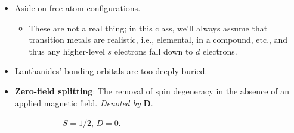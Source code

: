\documentclass[../notes.tex]{subfiles}
\begin{document}
\begin{itemize}
\begin{itemize}
    \end{itemize}
    \item Aside on free atom configurations.
    \begin{itemize}
        \item These are not a real thing; in this class, we'll always assume that transition metals are realistic, i.e., elemental, in a compound, etc., and thus any higher-level $s$ electrons fall down to $d$ electrons.
    \end{itemize}
    \item Lanthanides' bonding orbitals are too deeply buried.
    \item \textbf{Zero-field splitting}: The removal of spin degeneracy in the absence of an applied magnetic field. \emph{Denoted by} $\bm{D}$.
    \begin{figure}[h!]
        \centering
        \footnotesize
        \begin{subfigure}[b]{0.49\linewidth}
            \centering
            \caption{$S=1/2$, $D=0$.}
            \label{fig:zeroFieldSplita}
        \end{subfigure}
        \begin{subfigure}[b]{0.49\linewidth}
            \centering
\end{subfigure}
\end{figure}
\end{itemize}
\end{document}
